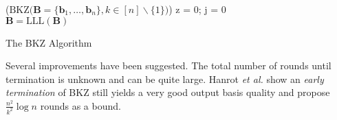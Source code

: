 \begin{algorithm2e} %
  \Begin($\text{BKZ} {(} \mathbf{B} = \{\mathbf{b}_1, \dots, \mathbf{b}_{n}\}, k \in [n]\backslash\{1\} {)}$) %
  {
      z = 0; j = 0\\
      $\mathbf{B} = \text{LLL}(\mathbf{B})$ \\%
    }
  \caption{The BKZ Algorithm \cite{SE91}} \label{alg:BKZ}
\end{algorithm2e} %


Several improvements have been suggested. The total number of rounds until termination is unknown and can be quite large. Hanrot \textit{et al.} \cite{HPS11a} show an \textit{early termination} of BKZ still yields a very good output basis quality and propose $\frac{n^2}{k^2} \log n$ rounds as a bound.


